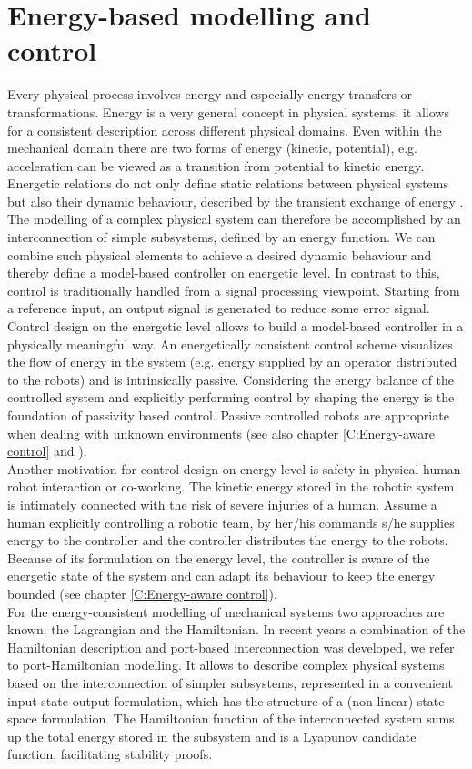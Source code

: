 \documentclass[a4paper,twoside, openright,12pt]{report}
\begin{document}
{\section{Energy-based modelling and control}
Every physical process involves energy and especially energy transfers or transformations. Energy is a very general concept in physical systems, it allows for a consistent description across different physical domains. Even within the mechanical domain there are two forms of energy (kinetic, potential), e.g. acceleration can be viewed as a transition from potential to kinetic energy. Energetic relations do not only define static relations between physical systems but also their dynamic behaviour, described by the transient exchange of energy \cite{Ortega_01}. The modelling of a complex physical system can therefore be accomplished by an interconnection of simple subsystems, defined by an energy function. We can combine such physical elements to achieve a desired dynamic behaviour and thereby define a model-based controller on energetic level.  In contrast to this, control is traditionally handled from a signal processing viewpoint. Starting from a reference input, an output signal is generated to reduce some error signal. Control design on the energetic level allows to build a model-based controller in a physically meaningful way. An energetically consistent control scheme visualizes the flow of energy in the system (e.g. energy supplied by an operator distributed to the robots) and is intrinsically passive. Considering the energy balance of the controlled system and explicitly performing control by shaping the energy is the foundation of passivity based control. Passive controlled robots are appropriate when dealing with unknown environments (see also chapter \ref{C:Energy-aware control} and \cite{Stramigioli_15}).\\
Another motivation for control design on energy level is safety in physical human-robot interaction or co-working. The kinetic energy stored in the robotic system is intimately connected with the risk of severe injuries of a human. Assume a human explicitly controlling a robotic team, by her/his commands s/he supplies energy to the controller and the controller distributes the energy to the robots. Because of its formulation on the energy level, the controller is aware of the energetic state of the system and can adapt its behaviour to keep the energy bounded (see chapter \ref{C:Energy-aware control}).\\
For the energy-consistent modelling of mechanical systems two approaches are known:  the Lagrangian and the Hamiltonian. In recent years a combination of the Hamiltonian description and port-based interconnection was developed, we refer to port-Hamiltonian modelling. It allows to describe complex physical systems based on the interconnection of simpler subsystems, represented in a convenient input-state-output formulation, which has the structure of a (non-linear) state space formulation. The Hamiltonian function of the interconnected system sums up the total energy stored in the subsystem and is a Lyapunov candidate function, facilitating stability proofs.

}
\end{document}
